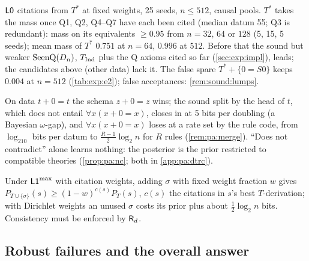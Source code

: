 \begin{remark}[E2]\pabrk{}\label{rem:pa:e2}
$\mathord{\mathsf{L0}}$ citations from $T^*$ at fixed weights, 25 seeds, $n\le512$, causal pools. $T^*$ takes the mass once Q1, Q2, Q4--Q7 have each been cited (median datum 55; Q3 is redundant): mass on its equivalents $\ge0.95$ from $n=32$, $64$ or $128$ (5, 15, 5 seeds); mean mass of $T^*$ $0.751$ at $n=64$, $0.996$ at $512$. Before that the sound but weaker $\mathrm{SeenQ}(D_n)$, $T_{\mathrm{Ind}}$ plus the Q axioms cited so far (\cref{sec:exp:impl}), leads; the \DTRC{} candidates above (other data) lack it. The false spare $T^*+\{0=S0\}$ keeps $0.004$ at $n=512$ (\cref{tab:exp:e2}); false acceptances: \cref{rem:sound:lumps}.
\end{remark}

\noindent On data $t+0=t$ the schema $z+0=z$ wins; the sound split by the head of $t$, which does not entail $\forall x(x+0=x)$, closes in at 5 bits per doubling (a Bayesian $\omega$-gap), and $\forall x(x+0=x)$ loses at a rate set by the rule code, from $\log_210$ bits per datum to $\frac{R-1}2\log_2n$ for $R$ rules (\cref{rem:pa:merge}). ``Does not contradict'' alone learns nothing: the posterior is the prior restricted to compatible theories (\cref{prop:pa:nc}; both in \cref{app:pa:dtrc}).

\begin{proposition}\pabrk{}\label{prop:pa:incons}
Under $\mathord{\mathsf{L1}}^{\max}$ with citation weights, adding $\sigma$ with fixed weight fraction $w$ gives $P_{T\cup\{\sigma\}}(s)\ge(1-w)^{c(s)}P_T(s)$, $c(s)$ the citations in $s$'s best $T$-derivation; with Dirichlet weights an unused $\sigma$ costs its prior plus about $\frac12\log_2n$ bits. Consistency must be enforced by $\mathsf{R}_{d}$.
\end{proposition}

\subsection{Robust failures and the overall answer}\label{sec:pa:failures}

